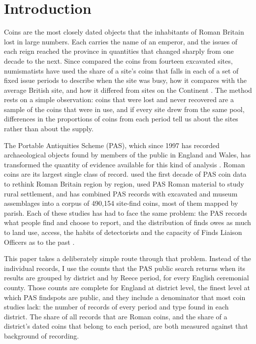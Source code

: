 \documentclass[11pt,a4paper]{article}
\begin{document}
\section{Introduction}\label{sec:intro}
Coins are the most closely dated objects that the inhabitants of Roman Britain lost in large numbers. Each carries the name of an emperor, and the issues of each reign reached the province in quantities that changed sharply from one decade to the next. Since \citet{reece1972} compared the coins from fourteen excavated sites, numismatists have used the share of a site's coins that falls in each of a set of fixed issue periods to describe when the site was busy, how it compares with the average British site, and how it differed from sites on the Continent \citep{casey1986,reece1987,reece1995}. The method rests on a simple observation: coins that were lost and never recovered are a sample of the coins that were in use, and if every site drew from the same pool, differences in the proportions of coins from each period tell us about the sites rather than about the supply.

The Portable Antiquities Scheme (PAS), which since 1997 has recorded archaeological objects found by members of the public in England and Wales, has transformed the quantity of evidence available for this kind of analysis \citep{bland2005,bland2017,lewis2016}. Roman coins are its largest single class of record. \citet{walton2012} used the first decade of PAS coin data to rethink Roman Britain region by region, \citet{brindle2014} used PAS Roman material to study rural settlement, and \citet{henry2024} has combined PAS records with excavated and museum assemblages into a corpus of 490,154 site-find coins, most of them mapped by parish. Each of these studies has had to face the same problem: the PAS records what people find and choose to report, and the distribution of finds owes as much to land use, access, the habits of detectorists and the capacity of Finds Liaison Officers as to the past \citep{robbins2012,robbins2013,cooper2016}.

This paper takes a deliberately simple route through that problem. Instead of the individual records, I use the counts that the PAS public search returns when its results are grouped by district and by Reece period, for every English ceremonial county. Those counts are complete for England at district level, the finest level at which PAS findspots are public, and they include a denominator that most coin studies lack: the number of records of every period and type found in each district. The share of all records that are Roman coins, and the share of a district's dated coins that belong to each period, are both measured against that background of recording.
\end{document}
